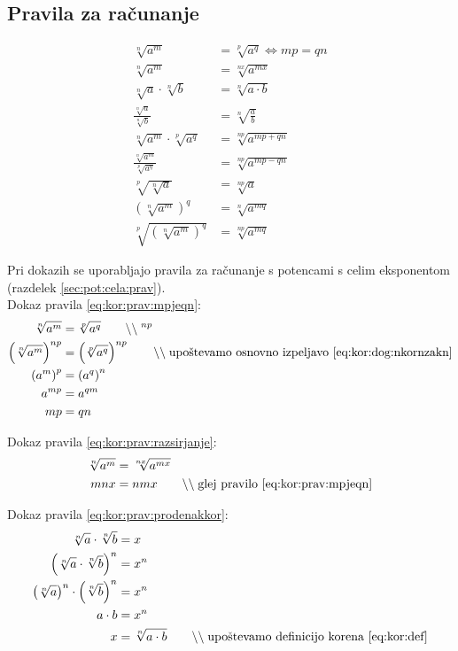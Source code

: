 \documentclass[a4paper,oneside,12pt,fleqn]{article}
\newcommand\krat\cdot
\newcommand{\comment}[1]{\ensuremath{\qquad\backslash\backslash\;}\textnormal{#1}}
\renewcommand\iff\Leftrightarrow
\numberwithin{equation}{section}
\begin{document}
\subsection{Pravila za računanje}
\label{sec:kor:prav}
\begin{align}
  \sqrt[n]{a^m} &= \sqrt[p]{a^q} \iff mp = qn \label{eq:kor:prav:mpjeqn} \\
  \sqrt[n]{a^m} &= \sqrt[nx]{a^{mx}} \label{eq:kor:prav:razsirjanje} \\
  \sqrt[n]{a} \krat \sqrt[n]{b} &= \sqrt[n]{a \krat b} \label{eq:kor:prav:prodenakkor} \\
  \frac{\sqrt[n]{a}}{\sqrt[n]{b}} &= \sqrt[n]{\frac{a}{b}} \label{eq:kor:prav:ulenakkor} \\
  \sqrt[n]{a^m} \krat \sqrt[p]{a^q} &= \sqrt[np]{a^{mp+qn}} \label{eq:kor:prav:prodkor} \\
  \frac{\sqrt[n]{a^m}}{\sqrt[p]{a^q}} &= \sqrt[np]{a^{mp-qn}} \label{eq:kor:prav:kvockor} \\
  \sqrt[p]{\sqrt[n]{a}} &= \sqrt[np]{a} \label{eq:kor:prav:korkor} \\
  \left( \sqrt[n]{a^m} \right)^q &= \sqrt[n]{a^{mq}}  \label{eq:kor:prav:koranannaq} \\
  \sqrt[p]{\left( \sqrt[n]{a^m} \right)^q} &= \sqrt[np]{a^{mq}} \label{eq:kor:prav:korkoranannaq}
\end{align}

Pri dokazih se uporabljajo pravila za računanje s potencami s celim eksponentom (razdelek
\ref{sec:pot:cela:prav}).\\[5pt]
Dokaz pravila \ref{eq:kor:prav:mpjeqn}:
\begin{align*}
  \sqrt[n]{a^m} &= \sqrt[p]{a^q} \comment{$^{np}$} \\
  \left(\sqrt[n]{a^m}\right)^{np} &= \left(\sqrt[p]{a^q} \right)^{np} \comment{upoštevamo
  osnovno izpeljavo \eqref{eq:kor:dog:nkornzakn}} \\
  \left( a^m \right)^p &= \left( a^q \right)^n \\
  a^{mp} &= a^{qm} \\
  mp &= qn
\end{align*}

Dokaz pravila \ref{eq:kor:prav:razsirjanje}:
\begin{align*}
  \sqrt[n]{a^m} &= \sqrt[nx]{a^{mx}} \\
  mnx &= nmx \comment{glej pravilo \eqref{eq:kor:prav:mpjeqn}}
\end{align*}

Dokaz pravila \ref{eq:kor:prav:prodenakkor}:
\begin{align*}
  \sqrt[n]{a} \krat \sqrt[n]{b} &= x \\
  \left( \sqrt[n]{a} \krat \sqrt[n]{b} \right)^n &= x^n \\
  \left(\sqrt[n]{a}\right)^n \krat \left(\sqrt[n]{b} \right)^n &= x^n \\
  a \krat b &= x^n \\
  x &= \sqrt[n]{a\krat b} \comment{upoštevamo definicijo korena \eqref{eq:kor:def}}
\end{align*}
\end{document}
